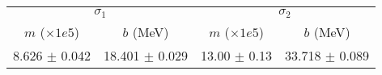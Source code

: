 \begin{tabular}{cc|cc}
\multicolumn{2}{c|}{$\sigma_1$} & \multicolumn{2}{|c}{$\sigma_2$} \\
$m$ ($\times1e5$) & $b$ (MeV) & $m$ ($\times1e5$) & $b$ (MeV) \\
\hline
8.626 $\pm$ 0.042 & 18.401 $\pm$ 0.029 & 13.00 $\pm$ 0.13 & 33.718 $\pm$ 0.089\\
\end{tabular}
